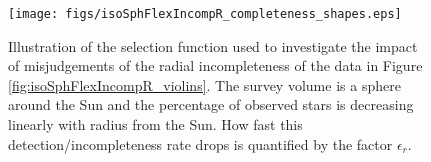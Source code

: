 



\begin{figure}[!htbp]
\centering
\texttt{[image: figs/isoSphFlexIncompR\_completeness\_shapes.eps]}
\caption{Illustration of the selection function used to investigate the impact of misjudgements of the radial incompleteness of the data in Figure \ref{fig:isoSphFlexIncompR_violins}. The survey volume is a sphere around the Sun and the percentage of observed stars is decreasing linearly with radius from the Sun. How fast this detection/incompleteness rate drops is quantified by the factor $\epsilon_r$.} 
\label{fig:isoSphFlexIncompR_completeness_shapes}
\end{figure}


